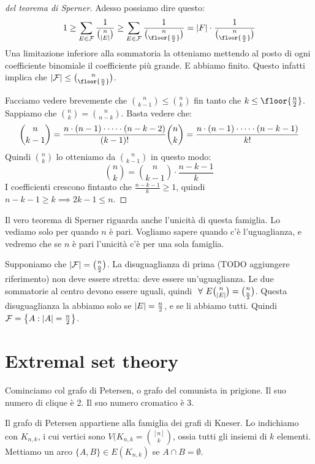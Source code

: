 \begin{proof}[del teorema di Sperner]
			Adesso possiamo dire questo:
			\[
				1 \ge \sum_{E \in \mathcal{F}} \frac{1}{\binom{n}{\abs{E}}} \ge \sum_{E \in \mathcal{F}} \frac{1}{\binom{n}{\floor{\frac{n}{2}}}} = \abs{F} \cdot \frac{1}{\binom{n}{\floor{\frac{n}{2}}}}
			\]
			Una limitazione inferiore alla sommatoria la otteniamo mettendo al posto di ogni coefficiente binomiale il coefficiente pi\`u grande.
			E abbiamo finito.
			Questo infatti implica che $\abs{\mathcal{F}} \le \binom{n}{\floor{\frac{n}{2}}}$.

			Facciamo vedere brevemente che $\binom{n}{k-1} \le \binom{n}{k}$ fin tanto che $k \le \floor{\frac{n}{2}}$.
			Sappiamo che $\binom{n}{k} = \binom{n}{n - k}$.
			Basta vedere che:
			\[
				\binom{n}{k-1} = \frac{n \cdot (n-1) \cdot \dots \cdot (n - k - 2)}{(k-1)!} \\
				\binom{n}{k} = \frac{n \cdot (n-1) \cdot \dots \cdot (n - k - 1)}{k!}
			\]
			Quindi $\binom{n}{k}$ lo otteniamo da $\binom{n}{k-1}$ in questo modo:
			\[
				\binom{n}{k} = \binom{n}{k-1} \cdot \frac{n - k - 1}{k}
			\]
			I coefficienti crescono fintanto che $\frac{n - k - 1}{k} \ge 1$, quindi $n - k - 1 \ge k \implies 2 k - 1 \le n$.
		\end{proof}

		Il vero teorema di Sperner riguarda anche l'unicit\`a di questa famiglia.
		Lo vediamo solo per quando $n$ \`e pari.
		Vogliamo sapere quando c'\`e l'uguaglianza, e vedremo che se $n$ \`e pari l'unicit\`a c'\`e per una sola famiglia.

		Supponiamo che $\left\lvert{\mathcal{F}}\right\rvert = \binom{n}{\frac{n}{2}}$.
		La disuguaglianza di prima (TODO aggiungere riferimento) non deve essere stretta: deve essere un'uguaglianza.
		Le due sommatorie al centro devono essere uguali, quindi $\forall E \binom{n}{\abs{E}} = \binom{n}{\frac{n}{2}}$.
		Questa disuguaglianza la abbiamo solo se $\left\lvert{E}\right\rvert = \frac{n}{2}$, e se li abbiamo tutti.
		Quindi $\mathcal{F} = \left\{ A : \left\lvert{A}\right\rvert = \frac{n}{2} \right\}$.

		\section{Extremal set theory}

		Cominciamo col grafo di Petersen, o grafo del comunista in prigione.
		Il suo numero di clique \`e 2.
		Il suo numero cromatico \`e 3.

		Il grafo di Petersen appartiene alla famiglia dei grafi di Kneser.
		Lo indichiamo con $K_{n,k}$, i cui vertici sono $V(K_{n,k} = \binom{[n]}{k}$, ossia tutti gli insiemi di $k$ elementi.
		Mettiamo un arco $\{A,B\} \in E(K_{n,k})$ se $A \cap B = \emptyset$.

